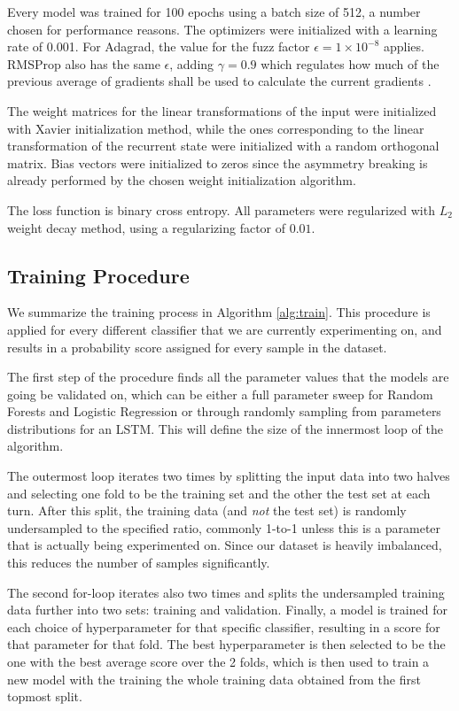 \documentclass{kththesis}
\begin{document}
Every model was trained for 100 epochs using a batch size of 512, a number chosen for performance reasons. The optimizers were initialized with a learning rate of 0.001. For Adagrad, the value for the fuzz factor $\epsilon=1\times10^{-8}$ applies. RMSProp also has the same $\epsilon$, adding $\gamma=0.9$ which regulates how much of the previous average of gradients shall be used to calculate the current gradients .

The weight matrices for the linear transformations of the input were initialized with Xavier initialization method, while the ones corresponding to the linear transformation of the recurrent state were initialized with a random orthogonal matrix. Bias vectors were initialized to zeros since the asymmetry breaking is already performed by the chosen weight initialization algorithm.

The loss function is binary cross entropy. All parameters were regularized with $L_2$ weight decay method, using a regularizing factor of $0.01$.

\subsection{Training Procedure}

We summarize the training process in Algorithm \autoref{alg:train}. This procedure is applied for every different classifier that we are currently experimenting on, and results in a probability score assigned for every sample in the dataset.

The first step of the procedure finds all the parameter values that the models are going be validated on, which can be either a full parameter sweep for Random Forests and Logistic Regression or through randomly sampling from parameters distributions for an LSTM. This will define the size of the innermost loop of the algorithm. 

The outermost loop iterates two times by splitting the input data into two halves and selecting one fold to be the training set and the other the test set at each turn. After this split, the training data (and \emph{not} the test set) is randomly undersampled to the specified ratio, commonly 1-to-1 unless this is a parameter that is actually being experimented on. Since our dataset is heavily imbalanced, this reduces the number of samples significantly.

The second for-loop iterates also two times and splits the undersampled training data further into two sets: training and validation. Finally, a model is trained for each choice of hyperparameter for that specific classifier, resulting in a score for that parameter for that fold. The best hyperparameter is then selected to be the one with the best average score over the 2 folds, which is then used to train a new model with the training the whole training data obtained from the first topmost split.
\end{document}

